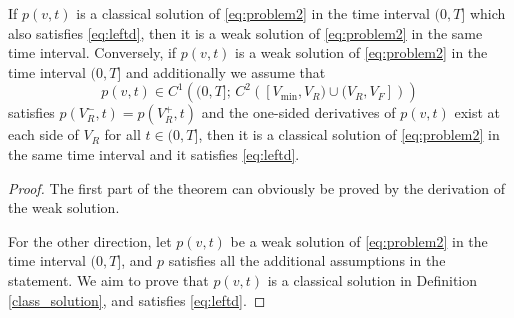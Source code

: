 \begin{theorem} 
If $p(v,t)$ is a classical solution of \eqref{eq:problem2} in the time interval $(0, T]$ which also satisfies \eqref{eq:leftd}, then it is a weak solution of \eqref{eq:problem2} in the same time interval. Conversely, if $p(v,t)$ is a weak solution of \eqref{eq:problem2} in the time interval $(0, T]$ and additionally we assume that $$p(v,t) \in C^{1}\left((0,T];\,C^{2}\left([V_{\min},V_R)\cup(V_R,V_F]\right)\right) $$ satisfies $p(V_R^-,t)=p(V_R^+,t)$ and the one-sided derivatives of $p(v,t)$ exist at each side of $V_R$ for all $t\in(0,T] $, then it is a classical solution of \eqref{eq:problem2} in the same time interval and it satisfies \eqref{eq:leftd}.
\end{theorem}
\begin{proof}
The first part of the theorem can obviously be proved by the derivation of the weak solution. 

For the other direction, let $p(v,t)$ be a weak solution of \eqref{eq:problem2} in the time interval $(0, T]$, and $p$ satisfies all the additional assumptions in the statement. We aim to prove that $p(v,t)$ is a classical solution in Definition \ref{class_solution}, and satisfies \eqref{eq:leftd}. 



\end{proof}
